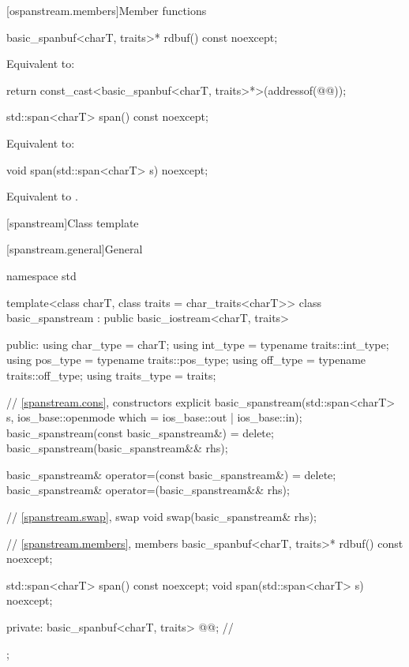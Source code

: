[ospanstream.members]{Member functions}

%
\begin{itemdecl}
basic_spanbuf<charT, traits>* rdbuf() const noexcept;
\end{itemdecl}

\begin{itemdescr}
\pnum
\effects
Equivalent to:
\begin{codeblock}
return const_cast<basic_spanbuf<charT, traits>*>(addressof(@@));
\end{codeblock}
\end{itemdescr}

%
\begin{itemdecl}
std::span<charT> span() const noexcept;
\end{itemdecl}

\begin{itemdescr}
\pnum
\effects
Equivalent to: 
\end{itemdescr}

%
\begin{itemdecl}
void span(std::span<charT> s) noexcept;
\end{itemdecl}

\begin{itemdescr}
\pnum
\effects
Equivalent to .
\end{itemdescr}

[spanstream]{Class template }

[spanstream.general]{General}

%
\begin{codeblock}
namespace std {
  template<class charT, class traits = char_traits<charT>>
  class basic_spanstream
    : public basic_iostream<charT, traits> {
  public:
    using char_type   = charT;
    using int_type    = typename traits::int_type;
    using pos_type    = typename traits::pos_type;
    using off_type    = typename traits::off_type;
    using traits_type = traits;

    // \ref{spanstream.cons}, constructors
    explicit basic_spanstream(std::span<charT> s,
                              ios_base::openmode which = ios_base::out | ios_base::in);
    basic_spanstream(const basic_spanstream&) = delete;
    basic_spanstream(basic_spanstream&& rhs);

    basic_spanstream& operator=(const basic_spanstream&) = delete;
    basic_spanstream& operator=(basic_spanstream&& rhs);

    // \ref{spanstream.swap}, swap
    void swap(basic_spanstream& rhs);

    // \ref{spanstream.members}, members
    basic_spanbuf<charT, traits>* rdbuf() const noexcept;

    std::span<charT> span() const noexcept;
    void span(std::span<charT> s) noexcept;

  private:
    basic_spanbuf<charT, traits> @@;    // \expos
  };
}
\end{codeblock}

